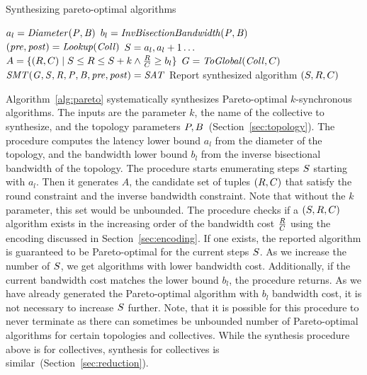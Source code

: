 \begin{algorithm}[b]
	\caption{Synthesizing pareto-optimal algorithms}
    \label{alg:pareto}
    \begin{algorithmic}[1]
        \State $a_l = \mathit{Diameter(P, B)}$ \State $b_l =
        \mathit{InvBisectionBandwidth(P, B)}$ \State $(\mathit{pre},
        \mathit{post}) = \mathit{Lookup(Coll)}$
         \For
        {$S=a_l,a_l+1\ldots$} \State $A = \{(R,C) \mid
        S \leq R \leq S+k \wedge
        \frac{R}{C} \geq b_l\}$  \State
        $G=\mathit{ToGlobal}(\mathit{Coll},C)$ \If
        {$\mathit{SMT(G, S, R, P, B, \mathit{pre},
        \mathit{post}) = SAT}$} \State Report synthesized algorithm
        $(S,R,C)$ 
         \EndIf {} \EndIf \EndFor
        \EndFor \EndProcedure
	\end{algorithmic}
\end{algorithm}

Algorithm~\ref{alg:pareto} systematically synthesizes Pareto-optimal
$k$-synchronous algorithms. The inputs are the parameter $k$, the name
of the collective to synthesize, and the topology parameters $P,
B$~(Section~\ref{sec:topology}). The procedure computes the latency
lower bound $a_l$ from the diameter of the topology, and the bandwidth
lower bound $b_l$ from the inverse bisectional bandwidth of the
topology. The procedure starts enumerating steps $S$ starting
with $a_l$. Then it generates $A$, the candidate set of tuples
$(R, C)$ that satisfy the round constraint and the inverse
bandwidth constraint. Note that without the $k$ parameter, this set
would be unbounded. The procedure checks if a
$(S,R,C)$ algorithm exists in the increasing order of
the bandwidth cost $\frac{R}{C}$ using the encoding
discussed in Section~\ref{sec:encoding}. If one exists, the reported
algorithm is guaranteed to be Pareto-optimal for the current steps
$S$. As we increase the number of $S$, we get algorithms
with lower bandwidth cost. Additionally, if the current bandwidth cost
matches the lower bound $b_l$, the procedure returns. As we have
already generated the Pareto-optimal algorithm with $b_l$ bandwidth
cost, it is not necessary to increase $S$ further. Note, that it
is possible for this procedure to never terminate as there can
sometimes be unbounded number of Pareto-optimal algorithms for certain
topologies and collectives. While the synthesis procedure above is for
\broadcasting collectives, synthesis for \reducing collectives is
similar~(Section~\ref{sec:reduction}).


